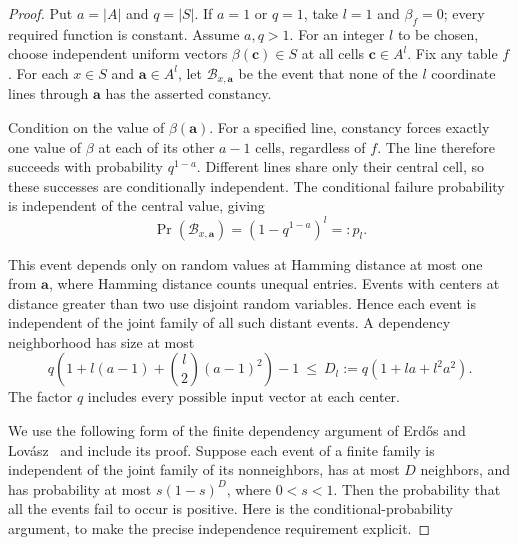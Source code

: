 \begin{proof}
Put $a=|A|$ and $q=|S|$. If $a=1$ or $q=1$, take $l=1$ and
$\beta_f=0$; every required function is constant. Assume $a,q>1$.
For an integer $l$ to be chosen, choose independent uniform vectors
$\beta(\mathbf c)\in S$ at all cells $\mathbf c\in A^l$. Fix any
table $f$. For each $x\in S$ and $\mathbf a\in A^l$, let
$\mathcal B_{x,\mathbf a}$ be the event that none of the $l$
coordinate lines through $\mathbf a$ has the asserted constancy.

Condition on the value of $\beta(\mathbf a)$. For a specified line,
constancy forces exactly one value of $\beta$ at each of its other
$a-1$ cells, regardless of $f$. The line therefore succeeds with
probability $q^{1-a}$. Different lines share only their central cell,
so these successes are conditionally independent. The conditional
failure probability is independent of the central value, giving
\[
                    \Pr(\mathcal B_{x,\mathbf a})
                          =(1-q^{1-a})^l=:p_l.
\]

This event depends only on random values at Hamming distance at most
one from $\mathbf a$, where Hamming distance counts unequal entries.
Events with centers at distance greater than two use disjoint random
variables. Hence each event is independent of the joint family of all
such distant events. A dependency neighborhood has size at most
\begin{equation}\label{alg:dependency-bound}
 q\left(1+l(a-1)+\binom l2(a-1)^2\right)-1
              \ \le\ D_l:=q(1+la+l^2a^2).
\end{equation}
The factor $q$ includes every possible input vector at each center.

We use the following form of the finite dependency argument of
Erd\H{o}s and Lov\'asz~\cite[Section~2]{ErdosLovasz1975} and include its proof. Suppose each event of a finite family
is independent of the joint family of its nonneighbors, has at most
$D$ neighbors, and has probability at most $s(1-s)^D$, where
$0<s<1$. Then the probability that all the events fail to occur is
positive. Here is the conditional-probability argument, to make the
precise independence requirement explicit.


\end{proof}
